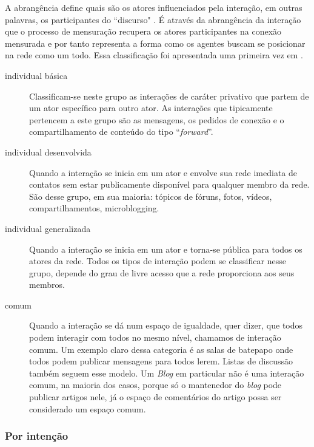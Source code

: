 \documentclass{article}
\begin{document}
A abrangência define quais são os atores influenciados pela interação, em
outras palavras, os participantes do ``discurso" \cite{Dooley2001}. É através da
abrangência da interação que o processo de mensuração recupera os atores
participantes na conexão mensurada e por tanto representa a forma como os
agentes buscam se posicionar na rede como um todo. Essa classificação foi
apresentada uma primeira vez em \cite{MARTINEZ2000}.
\begin{description}
\item[individual básica] Classificam-se neste grupo as interações de caráter
privativo que partem de um ator específico para outro ator. As interações que
tipicamente pertencem a este grupo são as mensagens, os pedidos de conexão e o
compartilhamento de conteúdo do tipo ``\textit{forward}''.
\item[individual desenvolvida] Quando a interação se inicia em um ator e envolve
sua rede imediata de contatos sem estar publicamente disponível para qualquer
membro da rede. São desse grupo, em sua maioria: tópicos de fóruns, fotos,
vídeos, compartilhamentos, microblogging.
\item[individual generalizada] Quando a interação se inicia em um ator e
torna-se pública para todos os atores da rede. Todos os tipos de interação podem
se classificar nesse grupo, depende do grau de livre acesso que a rede
proporciona aos seus membros.
\item[comum] Quando a interação se dá num espaço de igualdade, quer dizer, que
todos podem interagir com todos no mesmo nível, chamamos de interação comum. Um
exemplo claro dessa categoria é as salas de batepapo onde todos podem publicar
mensagens para todos lerem. Listas de discussão também seguem esse modelo.
Um \textit{Blog} em particular não é uma interação comum, na maioria dos casos,
porque só o mantenedor do \textit{blog} pode publicar artigos nele, já o
espaço de comentários do artigo possa ser considerado um espaço comum.
\end{description}

\subsubsection{Por intenção}
\end{document}
